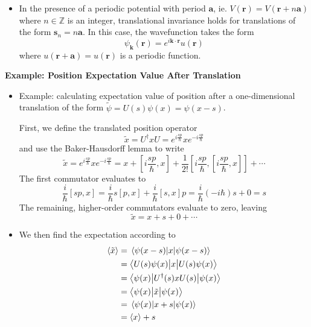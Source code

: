 \documentclass[11pt, a4paper]{article}
\renewcommand{\vec}[1]{\bm{#1}} %
\renewcommand{\t}[1]{\tilde{#1}}
\renewcommand{\r}{\vec{r}}  %
\newcommand{\p}{\psi}  %
\newcommand{\bmel}[3]{\big \langle {#1} \big | {#2} \big | {#3} \big \rangle}  %
\begin{document}
\begin{itemize}
	\item In the presence of a periodic potential with period $ \vec{a} $, ie. $ V(\r) = V(\r + n \vec{a}) $ where $ n \in \mathbb{Z} $ is an integer, translational invariance holds for translations of the form $ \vec{s}_{n} = n \vec{a} $. In this case, the wavefunction takes the form
	\begin{equation*}
		\psi_{\vec{k}}(\r) = e^{i\vec{k}\cdot \r}u(\r)
	\end{equation*}
	where $ u(\r + \vec{a}) = u(\r) $ is a periodic function. 
	
\end{itemize}	

\textbf{Example: Position Expectation Value After Translation}
\begin{itemize}	
	\item Example: calculating expectation value of position after a one-dimensional translation of the form $ \tilde{\p} = U(s)\p(x) = \p(x - s) $.
	
	First, we define the translated position operator
	\begin{equation*}
		\tilde{x} = U^{\dagger}xU = e^{i\frac{sp}{\hbar}} x e^{-i\frac{sp}{\hbar}}
	\end{equation*}
	and use the Baker-Hausdorff lemma to write
	\begin{equation*}
		\tilde{x} = e^{i\frac{sp}{\hbar}} x e^{-i\frac{sp}{\hbar}} = x + \left[ i \frac{sp}{\hbar}, x\right] + \frac{1}{2!}\left[i\frac{sp}{\hbar}, \left[ i \frac{sp}{\hbar}, x\right]\right] + \cdots 
	\end{equation*}
	The first commutator evaluates to
	\begin{equation*}
		\frac{i}{\hbar}[sp, x] = \frac{i}{\hbar} s[p, x] + \frac{i}{\hbar}[s, x]p = \frac{i}{\hbar}(-i\hbar)s + 0 = s
	\end{equation*}
	The remaining, higher-order commutators evaluate to zero, leaving
	\begin{equation*}
		\tilde{x} = x + s + 0 + \cdots
	\end{equation*}
	
	\item We then find the expectation according to 
	\begin{align*}
		\ev{\tilde{x}} &= \mel{\p(x-s)}{x}{\p(x - s)} \\
		& = \bmel{U(s)\p(x)}{x}{U(s)\p(x)}\\
		& = \bmel{\p(x)}{U^{\dagger}(s)xU(s)}{\p(x)}\\
		& = \bmel{\p(x)}{\t{x}}{\p(x)}\\
		& = \mel{\p(x)}{x + s}{\p(x)}\\
		& = \ev{x} + s
	\end{align*}
	 
\end{itemize}
\end{document}
